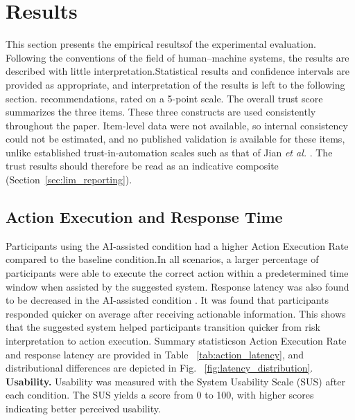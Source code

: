 \documentclass[journal]{IEEEtran}
\theoremstyle{plain}
\theoremstyle{definition}
\providecommand{\DIFaddtex}[1]{{\protect\color{blue} \sf #1}} %
\providecommand{\DIFdeltex}[1]{{\protect\color{red} \scriptsize #1}} %
\providecommand{\DIFaddbegin}{} %
\providecommand{\DIFaddend}{} %
\providecommand{\DIFdelbegin}{} %
\providecommand{\DIFdelend}{} %
\providecommand{\DIFadd}[1]{\texorpdfstring{\DIFaddtex{#1}}{#1}} %
\providecommand{\DIFdel}[1]{\texorpdfstring{\DIFdeltex{#1}}{}} %
\newcommand{\DIFscaledelfig}{0.5}
\newlength{\DIFdelgraphicswidth} %
\newlength{\DIFdelgraphicsheight} %
\newcommand{\DIFaddincludegraphics}[2][]{{\color{blue}\fbox{\DIFOincludegraphics[#1]{#2}}}} %
\newcommand{\DIFdelincludegraphics}[2][]{%
\sbox{\DIFdelgraphicsbox}{\DIFOincludegraphics[#1]{#2}}%
\settoboxwidth{\DIFdelgraphicswidth}{\DIFdelgraphicsbox} %
\settoboxtotalheight{\DIFdelgraphicsheight}{\DIFdelgraphicsbox} %
\scalebox{\DIFscaledelfig}{%
\parbox[b]{\DIFdelgraphicswidth}{\usebox{\DIFdelgraphicsbox}\\[-\baselineskip] \rule{\DIFdelgraphicswidth}{0em}}\llap{\resizebox{\DIFdelgraphicswidth}{\DIFdelgraphicsheight}{%
\setlength{\unitlength}{\DIFdelgraphicswidth}%
\begin{picture}(1,1)%
\thicklines\linethickness{2pt} %
{\color[rgb]{1,0,0}\put(0,0){\framebox(1,1){}}}%
{\color[rgb]{1,0,0}\put(0,0){\line( 1,1){1}}}%
{\color[rgb]{1,0,0}\put(0,1){\line(1,-1){1}}}%
\end{picture}%
}\hspace*{3pt}}} %
} %
\DeclareRobustCommand{\DIFaddbegin}{\DIFOaddbegin \let\includegraphics\DIFaddincludegraphics} %
\DeclareRobustCommand{\DIFaddend}{\DIFOaddend \let\includegraphics\DIFOincludegraphics} %
\DeclareRobustCommand{\DIFdelbegin}{\DIFOdelbegin \let\includegraphics\DIFdelincludegraphics} %
\DeclareRobustCommand{\DIFdelend}{\DIFOaddend \let\includegraphics\DIFOincludegraphics} %
\begin{document}
    \section{\DIFdel{Results}}
\addtocounter{section}{-1}%
\DIFdel{This section presents the empirical resultsof the experimental evaluation.
Following the conventions of the field of human--machine systems, the results are described with little interpretation.Statistical results and confidence intervals are provided as appropriate, and interpretation of the results is left to the following section. }\DIFdelend \DIFaddbegin \DIFadd{recommendations, rated on a 5-point scale. The overall trust score summarizes the three items. These three constructs are used consistently throughout the paper. Item-level data were not available, so internal consistency could not be estimated, and no published validation is available for these items, unlike established trust-in-automation scales such as that of Jian \emph{et al.} \cite{Jian2000}. The trust results should therefore be read as an indicative composite (Section~\ref{sec:lim_reporting}).
}\DIFaddend 

    \DIFdelbegin \subsection{\DIFdel{Action Execution and Response Time}}
\addtocounter{subsection}{-1}%
\DIFdel{Participants using the AI-assisted condition had a higher Action Execution Rate compared to the baseline condition.In all scenarios, a larger percentage of participants were able to execute the correct action within a predetermined time window when assisted by the suggested system.
    Response latency was also found to be decreased in the AI-assisted condition . It was found that participants responded quicker on average after receiving actionable information. This shows that the suggested system helped participants transition quicker from risk interpretation to action execution. Summary statisticson Action Execution Rate and response latency are provided in Table ~\ref{tab:action_latency}, and distributional differences are depicted in Fig. ~\ref{fig:latency_distribution}. }\DIFdelend \DIFaddbegin \DIFadd{\textbf{Usability.}
    Usability was measured with the System Usability Scale (SUS) \cite{Brooke1996} after each condition. The SUS yields a score from 0 to 100, with higher scores indicating better perceived usability.
}\DIFaddend 
\end{document}

